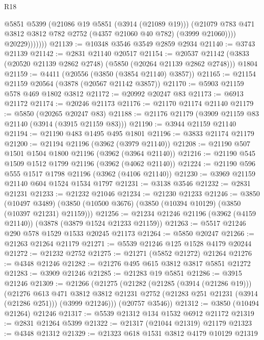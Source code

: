 \begin{lexlean}{R18}
\begin{coremodule}
                      @5851
                      @5399
                      (@21086 @19 @5851 (@3914 (@21089 @19)))
                      (@21079
                        @783
                        @471
                        @3812
                        @3812
                        @782
                        @2752
                        (@4357 @21060 @40 @782)
                        (@3999 @21060))))
                  @20229)))))))
@21139 := @10348 @3546 @3549 @2859 @2934
@21140 := @3743 @21139
@21142 := @2831 @21140 @20517
@21154 := @20537
    @21142
    (@3833 (@20520 @21139 @2862 @2748) (@5850 (@20264 @21139 @2862 @2748)))
    @1804
@21159 := @4411 (@20556 (@3850 (@3854 @21140) @3857))
@21165 := @21154 @21159 @20564 (@3878 (@20567 @21142 @3857))
@21170 := @5903 @21159 @578 @469 @1802 @3812
@21172 := @20992 @20247 @83
@21173 := @6913 @21172
@21174 := @20246 @21173
@21176 := @21170 @21174 @21140
@21179 := @5850 (@20265 @20247 @83)
@21188 := @21176 @21179 (@3909 @21159 @83 @21140 (@3914 (@3915 @21159 @83)))
@21190 := @3944 @21159 @21140
@21194 := @21190 @483 @1495 @495 @1801
@21196 := @3833 @21174 @21179
@21200 := @21194 @21196 (@3962 (@3979 @21140))
@21208 := @21190 @507 @1501 @1504 @1800 @21196 (@3962 (@3964 @21140))
@21216 := @21190 @545 @1509 @1512 @1799 @21196 (@3962 (@4062 @21140))
@21224 := @21190 @596 @555 @1517 @1798 @21196 (@3962 (@4106 @21140))
@21230 := @3969 @21159 @21140 @604 @1524 @1534 @1797
@21231 := @3138 @3546
@21232 := @2831 @21231
@21233 := @21232 @21046
@21234 := @21230 @21233
@21246 := @3850
    (@10497 @3489)
    (@3850 (@10500 @3676) (@3850 (@10394 @10129) (@3850 (@10397 @21231) @21159)))
@21256 := @21234 @21246 @21196 (@3962 (@4159 @21140)) (@3878 (@3879 @1524 @21233 @21159))
@21263 := @5517 @21246 @290 @578 @1529 @1533 @20245 @21173
@21264 := @5850 @20247
@21266 := @21263 @21264 @21179
@21271 := @5539 @21246 @125 @1528 @4179 @20244
@21272 := @21232 @2752
@21275 := @21271 (@5852 @21272) @21264
@21276 := @4348 @21246
@21282 := @21276 @495 @615 @3812 @3817 @5851 @21272
@21283 := @3909 @21246
@21285 := @21283 @19 @5851
@21286 := @3915 @21246
@21309 := @21266
    (@21275
      (@21282
        (@21285 (@3914 (@21286 @19)))
        (@21276
          @613
          @471
          @3812
          @3812
          @21231
          @2752
          (@21283 @251 @21231 (@3914 (@21286 @251)))
          (@3999 @21246)))
      (@20757 @3546))
@21312 := @3850 (@10494 @21264) @21246
@21317 := @5539 @21312 @134 @1532 @6912 @21172
@21319 := @2831 @21264 @5399
@21322 := @21317 (@21044 @21319) @21179
@21323 := @4348 @21312
@21329 := @21323 @618 @1531 @3812 @4179 @10129 @21319

\end{coremodule}
\end{lexlean}
